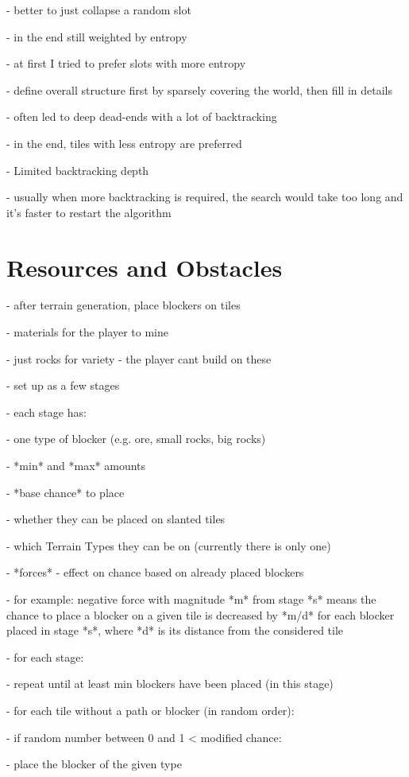 - better to just collapse a random slot

- in the end still weighted by entropy

- at first I tried to prefer slots with more entropy

- define overall structure first by sparsely covering the world, then fill in details

- often led to deep dead-ends with a lot of backtracking

- in the end, tiles with less entropy are preferred

- Limited backtracking depth

- usually when more backtracking is required, the search would take too long and it's faster to restart the algorithm

\section{Resources and Obstacles}

- after terrain generation, place blockers on tiles

- materials for the player to mine

- just rocks for variety - the player cant build on these

- set up as a few stages

- each stage has:

- one type of blocker (e.g. ore, small rocks, big rocks)

- *min* and *max* amounts

- *base chance* to place

- whether they can be placed on slanted tiles

- which Terrain Types they can be on (currently there is only one)

- *forces* - effect on chance based on already placed blockers

- for example: negative force with magnitude *m* from stage *s* means the chance to place a blocker on a given tile is decreased by *m/d*  for each blocker placed in stage *s*, where *d* is its distance from the considered tile

- for each stage:

- repeat until at least min blockers have been placed (in this stage)

- for each tile without a path or blocker (in random order):

- if random number between 0 and 1 < modified chance:

- place the blocker of the given type


